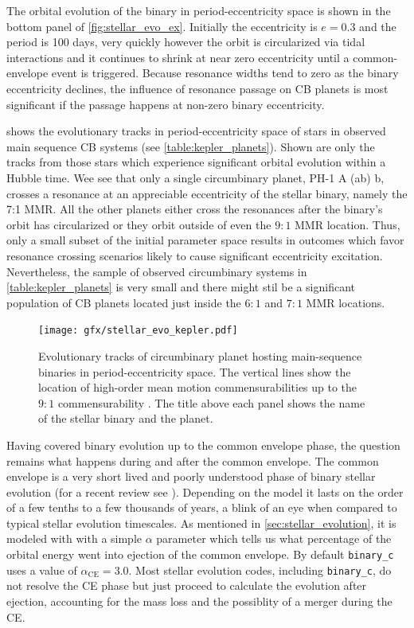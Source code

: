 \documentclass[twoside,openright,titlepage,numbers=noenddot,headinclude,%
                footinclude=true,cleardoublepage=empty,abstractoff, 
                BCOR=5mm,paper=a4,fontsize=11pt,%
                american,%
                ]{scrreprt}%
\begin{document}
The orbital evolution of the binary in period-eccentricity space is shown 
in the bottom panel of \cref{fig:stellar_evo_ex}. 
Initially the eccentricity is $e=0.3$ and the period is 100 days, 
very quickly however the orbit is circularized via tidal 
interactions and it continues to shrink at near zero eccentricity until
a common-envelope event is triggered. Because resonance widths tend to 
zero as the binary eccentricity declines, the influence of resonance
passage on CB planets is most significant if the passage happens
at non-zero binary eccentricity. 

 shows the 
evolutionary tracks in period-eccentricity space of stars in observed 
 main sequence CB systems (see \cref{table:kepler_planets}). 
 Shown are only the tracks
from those stars which experience significant orbital evolution within a 
Hubble time. Wee see that only a single circumbinary planet, PH-1 A (ab) b,
crosses a resonance at an appreciable eccentricity of the stellar binary,
namely the 7:1 MMR. All the other planets either cross the resonances
after the binary's orbit has circularized or they orbit outside of even
the $9:1$ MMR location. Thus, only a small subset of the initial parameter
space results in outcomes which favor resonance crossing scenarios likely
to cause significant eccentricity excitation. Nevertheless, the sample of 
observed circumbinary systems in \cref{table:kepler_planets} is very small 
and there might stil be a significant population of CB planets 
located just inside the $6:1$ and $7:1$ MMR locations.
\begin{figure}[htb]
\centering
\texttt{[image: gfx/stellar\_evo\_kepler.pdf]}
    \caption[MMR crossings.]{Evolutionary tracks of circumbinary 
    planet hosting main-sequence
    binaries in period-eccentricity space. The vertical lines show the location
     of high-order mean motion commensurabilities up to the $9:1$ commensurability
     . The title above each panel
     shows the name of the stellar binary and the planet.}
\label{fig:stellar_evo_kepler}
\end{figure}

Having covered binary evolution up to the common envelope phase, the question
remains what happens during and after the common envelope.
The common envelope is a very short lived and poorly understood phase of 
binary stellar evolution (for a recent review see \citet{Ivanova2013}). 
Depending on the model it lasts on the order of a few
tenths to a few thousands of years, a blink of an eye when compared to 
typical stellar evolution timescales. 
As mentioned in \cref{sec:stellar_evolution}, it is modeled with 
with a simple $\alpha$ parameter which tells us what percentage of the orbital 
energy went into ejection of the common envelope. By default 
\texttt{binary\_c} uses a value of $\alpha_\text{CE}=3.0$. Most stellar evolution codes,
including \texttt{binary\_c}, do not resolve the CE phase but just proceed to
calculate the evolution after ejection, accounting for the mass loss and the 
possiblity of a merger during the CE. 
\end{document}
